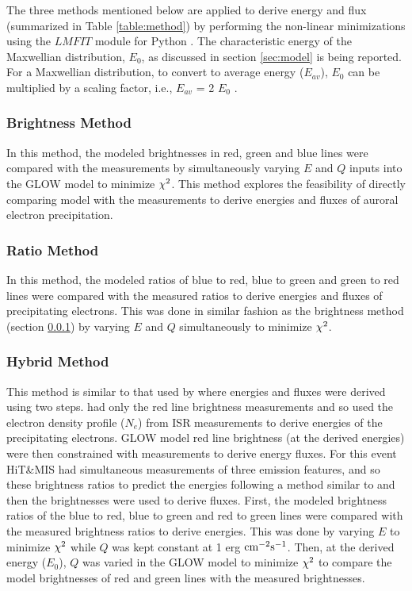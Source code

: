 \documentclass[crop=false,class=mitthesis,oneside,font=12pt]{standalone}
\begin{document}
The three methods mentioned below are applied to derive energy and flux (summarized in Table \ref{table:method}) by performing the non-linear minimizations using the $LMFIT$ module for Python \citep{lmfit}. The characteristic energy of the Maxwellian distribution, $E_0$, as discussed in section \ref{sec:model} is being reported. For a Maxwellian distribution, to convert to average energy ($E_{av}$), $E_0$ can be multiplied by a scaling factor, i.e., $E_{av}$ = 2 $E_0$ \citep{kosch_2001}.
\subsubsection{Brightness Method}
\label{sec:brightness}
In this method, the modeled brightnesses in red, green and blue lines were compared with the measurements by simultaneously varying $E$ and $Q$ inputs into the GLOW model to minimize $\rm \chi^2$. This method explores the feasibility of directly comparing model with the measurements to derive energies and fluxes of auroral electron precipitation.

\subsubsection{Ratio Method}
\label{sec:ratio}
In this method, the modeled ratios of blue to red, blue to green and green to red lines were compared with the measured ratios to derive energies and fluxes of precipitating electrons. This was done in similar fashion as the brightness method (section \ref{sec:brightness}) by varying $E$ and $Q$ simultaneously to minimize $\rm \chi^2$. 

\subsubsection{Hybrid Method}
\label{sec:2step}

This method is similar to that used by \cite{pallamraju_2011} where energies and fluxes were derived using two steps. \cite{pallamraju_2011} had only the red line brightness measurements and so used the electron density profile ($N_e$) from ISR measurements to derive energies of the precipitating electrons. GLOW model red line brightness (at the derived energies) were then constrained with measurements to derive energy fluxes. For this event HiT\&MIS had simultaneous measurements of three emission features, and so these brightness ratios to predict the energies following a method similar to \cite{rees_1974} and then the brightnesses were used to derive fluxes. First, the modeled brightness ratios of the blue to red, blue to green and red to green lines were compared with the measured brightness ratios to derive energies. This was done by varying $E$ to minimize $\rm \chi^2$ while $Q$ was kept constant at 1 erg $\rm cm^{-2} s^{-1}$. Then, at the derived energy ($E_0$), $Q$ was varied in the GLOW model to minimize $\rm \chi^2$ to compare the model brightnesses of red and green lines with the measured brightnesses. 
\end{document}
